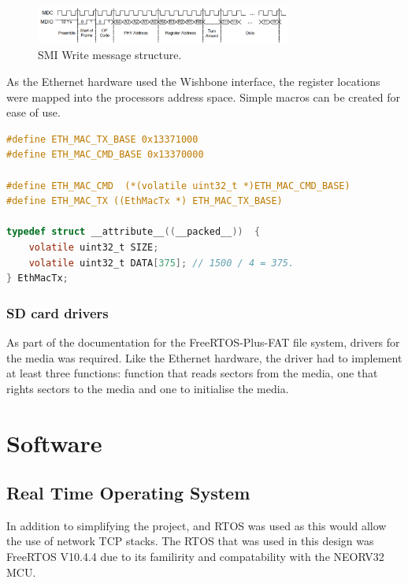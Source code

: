 \begin{figure}[h!]
    \centering
    \includegraphics[width=0.75\textwidth]{Images/SMIWriteStructure.png}
    \caption[SMI Write message structure]{SMI Write message structure. \cite{LAN8720ADatasheet}}
    \label{fig:smi_packet_structure}
\end{figure}


As the Ethernet hardware used the Wishbone interface, the register locations were mapped into the processors address space. Simple macros can be created for ease of use. 

\begin{lstlisting}[language=C, caption=Python example]
#define ETH_MAC_TX_BASE 0x13371000
#define ETH_MAC_CMD_BASE 0x13370000

#define ETH_MAC_CMD  (*(volatile uint32_t *)ETH_MAC_CMD_BASE)
#define ETH_MAC_TX ((EthMacTx *) ETH_MAC_TX_BASE)

typedef struct __attribute__((__packed__))  {
    volatile uint32_t SIZE;
    volatile uint32_t DATA[375]; // 1500 / 4 = 375.
} EthMacTx;
\end{lstlisting}








\subsubsection{SD card drivers}
As part of the documentation for the FreeRTOS-Plus-FAT file system, drivers for the media was required. Like the Ethernet hardware, the driver had to implement at least three functions: function that reads sectors from the media, one that rights sectors to the media and one to initialise the media. 




\section{Software}



\subsection{Real Time Operating System}
In addition to simplifying the project, and RTOS was used as this would allow the use of network TCP stacks. The RTOS that was used in this design was FreeRTOS V10.4.4 due to its familirity and compatability with the NEORV32 MCU.


